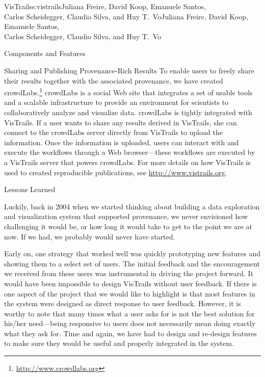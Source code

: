 \begin{aosachaptertoc}{VisTrails}{s:vistrails}{Juliana Freire, David Koop, Emanuele Santos, \\ Carlos Scheidegger, Claudio Silva, and Huy T.\ Vo}{Juliana Freire, David Koop, Emanuele Santos, \\ \hspace*{0.9cm} Carlos Scheidegger, Claudio Silva, and Huy T.\ Vo}
\begin{aosasect1}{Components and Features}
\begin{aosasect2}{Sharing and Publishing Provenance-Rich Results}
To enable users to freely share their results together with the
associated provenance, we have created
crowdLabs.\footnote{\url{http://www.crowdlabs.org}} crowdLabs is a
social Web site that integrates a set of usable tools and a scalable
infrastructure to provide an environment for scientists to
collaboratively analyze and visualize data.  crowdLabs is tightly
integrated with VisTrails. If a user wants to share any results
derived in VisTrails, she can connect to the crowdLabs server directly
from VisTrails to upload the information. Once the information is
uploaded, users can interact with and execute the workflows through a
Web browser---these workflows are executed by a VisTrails server that
powers crowdLabs. For more details on how VisTrails is used to created reproducible publications, see \url{http://www.vistrails.org}.

\end{aosasect2}

\end{aosasect1}

\begin{aosasect1}{Lessons Learned}

Luckily, back in 2004 when we started thinking about building a data
exploration and visualization system that supported provenance, we
never envisioned how challenging it would be, or how long it would
take to get to the point we are at now. If we had, we probably would
never have started.

Early on, one strategy that worked well was quickly prototyping new
features and showing them to a select set of users. The initial
feedback and the encouragement we received from these users was
instrumental in driving the project forward. It would have been
impossible to design VisTrails without user feedback. If there is one
aspect of the project that we would like to highlight is that most
features in the system were designed as direct response to user
feedback. However, it is worthy to note that many times what a user
asks for is not the best solution for his/her need---being responsive
to users does not necessarily mean doing exactly what they ask for.
Time and again, we have had to design and re-design features to make
sure they would be useful and properly integrated in the system.


\end{aosasect1}
\end{aosachaptertoc}
